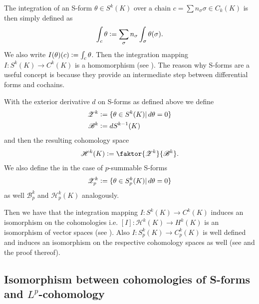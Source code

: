 \documentclass[12pt,a4paper]{article}
\theoremstyle{definition}
\begin{document}
The integration of an S-form $\theta \in S^k(K)$ over a chain
$c = \sum n_\sigma \sigma \in C_k(K)$ is then simply defined as 
\begin{align*}
    \int_c \theta 
    \vcentcolon= \sum\limits_\sigma n_\sigma \int_\sigma \theta(\sigma).
\end{align*}
We also write $I(\theta)(c) \vcentcolon= \int_c \theta$.
Then the integration mapping $I: S^k(K) \rightarrow C^k(K)$ is a homomorphism
(see \cite[p.191]{goldshtein}).
The reason why S-forms are a useful concept is because they provide an 
intermediate step between differential forms and cochains.

With the exterior derivative $d$ on S-forms as defined above we define 
\begin{align*}
    \mathscr{Z}^k &\vcentcolon= \{ \theta \in S^k(K) | \, d\theta = 0 \} \\
    \mathscr{B}^k &\vcentcolon= dS^{k-1}(K)
\end{align*}
and then the resulting cohomology space
\begin{align*}
    \mathscr{H}^k(K) \vcentcolon= 
    \faktor{\mathscr{Z}^k}{\mathscr{B}^k}.
\end{align*}
We also define the in the case of $p$-summable S-forms
\begin{align*}
    \mathscr{Z}_p^k &\vcentcolon= \{ \theta \in S_p^k(K) | \, d\theta = 0 \} \\
\end{align*}
as well $\mathscr{B}_p^k$ and $\mathscr{H}_p^k(K)$ analogously.

Then we have that the integration mapping
$I: S^k(K) \rightarrow C^k(K)$ 
induces an isomorphism on the cohomologies i.e. 
$[I]: \mathscr{H}^k(K) \rightarrow H^k(K)$ is an isomorphism of vector 
spaces (see \cite[p.191]{goldshtein}).
Also $I: S_p^k(K) \rightarrow C_p^k(K)$ is well defined and induces an
isomorphism on the respective cohomology spaces as well 
(see \cite[Thm.\,1]{goldshtein} and the proof thereof).



\subsection{Isomorphism between cohomologies of S-forms and $L^p$-cohomology}
\end{document}
